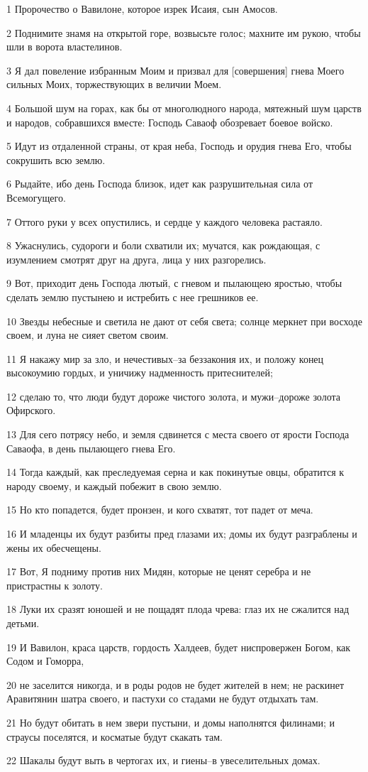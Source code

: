 \par 1 Пророчество о Вавилоне, которое изрек Исаия, сын Амосов.
\par 2 Поднимите знамя на открытой горе, возвысьте голос; махните им рукою, чтобы шли в ворота властелинов.
\par 3 Я дал повеление избранным Моим и призвал для [совершения] гнева Моего сильных Моих, торжествующих в величии Моем.
\par 4 Большой шум на горах, как бы от многолюдного народа, мятежный шум царств и народов, собравшихся вместе: Господь Саваоф обозревает боевое войско.
\par 5 Идут из отдаленной страны, от края неба, Господь и орудия гнева Его, чтобы сокрушить всю землю.
\par 6 Рыдайте, ибо день Господа близок, идет как разрушительная сила от Всемогущего.
\par 7 Оттого руки у всех опустились, и сердце у каждого человека растаяло.
\par 8 Ужаснулись, судороги и боли схватили их; мучатся, как рождающая, с изумлением смотрят друг на друга, лица у них разгорелись.
\par 9 Вот, приходит день Господа лютый, с гневом и пылающею яростью, чтобы сделать землю пустынею и истребить с нее грешников ее.
\par 10 Звезды небесные и светила не дают от себя света; солнце меркнет при восходе своем, и луна не сияет светом своим.
\par 11 Я накажу мир за зло, и нечестивых--за беззакония их, и положу конец высокоумию гордых, и уничижу надменность притеснителей;
\par 12 сделаю то, что люди будут дороже чистого золота, и мужи--дороже золота Офирского.
\par 13 Для сего потрясу небо, и земля сдвинется с места своего от ярости Господа Саваофа, в день пылающего гнева Его.
\par 14 Тогда каждый, как преследуемая серна и как покинутые овцы, обратится к народу своему, и каждый побежит в свою землю.
\par 15 Но кто попадется, будет пронзен, и кого схватят, тот падет от меча.
\par 16 И младенцы их будут разбиты пред глазами их; домы их будут разграблены и жены их обесчещены.
\par 17 Вот, Я подниму против них Мидян, которые не ценят серебра и не пристрастны к золоту.
\par 18 Луки их сразят юношей и не пощадят плода чрева: глаз их не сжалится над детьми.
\par 19 И Вавилон, краса царств, гордость Халдеев, будет ниспровержен Богом, как Содом и Гоморра,
\par 20 не заселится никогда, и в роды родов не будет жителей в нем; не раскинет Аравитянин шатра своего, и пастухи со стадами не будут отдыхать там.
\par 21 Но будут обитать в нем звери пустыни, и домы наполнятся филинами; и страусы поселятся, и косматые будут скакать там.
\par 22 Шакалы будут выть в чертогах их, и гиены--в увеселительных домах.

